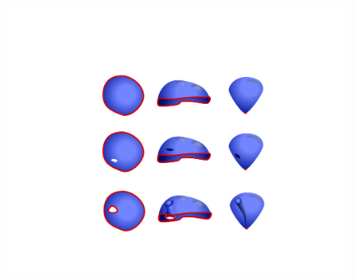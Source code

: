  \begin{figure}[htbp]
 \centering
     \includegraphics[scale=0.5]{figures/balloons.pdf}
      \caption{}
      \label{fig:balloons}
  \end{figure}

